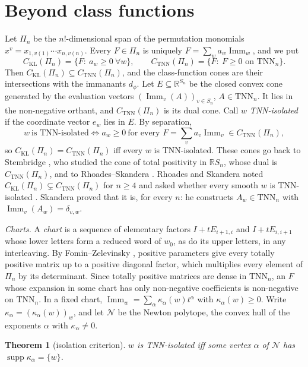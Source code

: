 \documentclass[11pt]{amsart}
\newtheorem{theorem}{Theorem}[section]
\theoremstyle{definition}
\theoremstyle{remark}
\newcommand{\R}{\mathbb{R}}
\newcommand{\Imm}{\operatorname{Imm}}
\newcommand{\TNN}{\mathrm{TNN}}
\newcommand{\CKL}{C_{\mathrm{KL}}}
\newcommand{\CTNN}{C_{\mathrm{TNN}}}
\newcommand{\supp}{\operatorname{supp}}
\begin{document}
\section{Beyond class functions}\label{sec:beyond}

Let $\Pi_n$ be the $n!$-dimensional span of the permutation monomials $x^v=x_{1,v(1)}\cdots x_{n,v(n)}$. Every $F\in\Pi_n$ is uniquely $F=\sum_wa_w\Imm_w$, and we put
\[
\CKL(\Pi_n)=\{F:\ a_w\ge0\ \forall w\},\qquad \CTNN(\Pi_n)=\{F:\ F\ge0\text{ on }\TNN_n\}.
\]
Then $\CKL(\Pi_n)\subseteq\CTNN(\Pi_n)$, and the class-function cones are their intersections with the immanants $d_\phi$. Let $E\subseteq\R^{S_n}$ be the closed convex cone generated by the evaluation vectors $(\Imm_v(A))_{v\in S_n}$, $A\in\TNN_n$. It lies in the non-negative orthant, and $\CTNN(\Pi_n)$ is its dual cone. Call $w$ \emph{TNN-isolated} if the coordinate vector $e_w$ lies in $E$. By separation,
\[
w\ \text{is TNN-isolated}\iff a_w\ge0\ \text{for every }F=\sum_va_v\Imm_v\in\CTNN(\Pi_n),
\]
so $\CKL(\Pi_n)=\CTNN(\Pi_n)$ iff every $w$ is TNN-isolated. These cones go back to Stembridge \cite[\S5]{Ste92}, who studied the cone of total positivity in $\R S_n$, whose dual is $\CTNN(\Pi_n)$, and to Rhoades--Skandera \cite[\S7]{RS06}. Rhoades and Skandera noted $\CKL(\Pi_n)\subsetneq\CTNN(\Pi_n)$ for $n\ge4$ and asked whether every smooth $w$ is TNN-isolated \cite[Question~7.1]{RS06}. Skandera \cite[Thms.~5.4, 5.5]{Ska08} proved that it is, for every $n$: he constructs $A_w\in\TNN_n$ with $\Imm_v(A_w)=\delta_{v,w}$.

\emph{Charts.} A \emph{chart} is a sequence of elementary factors $I+tE_{i+1,i}$ and $I+tE_{i,i+1}$ whose lower letters form a reduced word of $w_0$, as do its upper letters, in any interleaving. By Fomin--Zelevinsky \cite{FZ}, positive parameters give every totally positive matrix up to a positive diagonal factor, which multiplies every element of $\Pi_n$ by its determinant. Since totally positive matrices are dense in $\TNN_n$, an $F$ whose expansion in some chart has only non-negative coefficients is non-negative on $\TNN_n$. In a fixed chart, $\Imm_w=\sum_\alpha\kappa_\alpha(w)t^\alpha$ with $\kappa_\alpha(w)\ge0$. Write $\kappa_\alpha=(\kappa_\alpha(w))_w$, and let $\mathcal N$ be the Newton polytope, the convex hull of the exponents $\alpha$ with $\kappa_\alpha\ne0$.

\begin{theorem}[isolation criterion]\label{thm:isolation}
$w$ is TNN-isolated iff some vertex $\alpha$ of $\mathcal N$ has $\supp\kappa_\alpha=\{w\}$.
\end{theorem}
\end{document}

